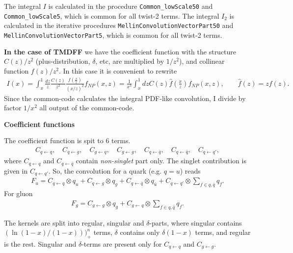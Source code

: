 \documentclass[prd,nofootinbib,eqsecnum,final]{revtex4}
\newcommand{\ot}{\leftarrow}
\renewcommand{\(}{\left(}
\renewcommand{\)}{\right)}
\renewcommand{\[}{\left[}
\renewcommand{\]}{\right]}
\begin{document}
The integral $I$ is calculated in the procedure \texttt{Common\_lowScale50} and \texttt{Common\_lowScale5}, which is common for all twist-2 terms. The integral $I_2$ is calculated in the iterative procedures \texttt{MellinConvolutionVectorPart50} and \texttt{MellinConvolutionVectorPart5}, which is common for all twist-2 terms. 

\textbf{In the case of TMDFF} we have the coefficient function with the structure $C(z)/z^2$ (plus-distribution, $\delta$, etc, are multiplied by $1/z^2$), and collinear function $f(z)/z^2$. In this case it is convenient to rewrite
\begin{eqnarray}
I(x)=\int_x^1 \frac{dz}{z}\frac{C(z)}{z^2}\frac{f\(\frac{x}{z}\)}{(x/z)^2}f_{NP}(x,z)=\frac{1}{x^3}\int_x^1 dz C(z)\hat f\(\frac{x}{z}\)f_{NP}(x,z),\qquad \hat f(z)=zf(z).
\end{eqnarray}
Since the common-code calculates the integral PDF-like convolution, I divide by factor $1/x^2$ all output of the common-code.

\begin{center}
\textbf{Coefficient functions}
\end{center}

The coefficient function is spit to 6 terms.
\begin{eqnarray}
C_{q\ot q},\quad C_{q\ot g},\quad C_{g\ot q},\quad C_{g\ot g},\quad C_{q\ot \bar q},\quad C_{q\ot \bar q},\quad C_{q\ot q'},
\end{eqnarray}
where $C_{q\ot q}$ and $C_{q\ot \bar q}$ contain \textit{non-singlet} part only. The singlet contribution is given in $C_{q\ot q'}$. So, the convolution for a quark (e.g. $q=u$) reads
\begin{eqnarray}
F_u=C_{q\ot q}\otimes q_u+C_{q\ot g}\otimes q_g+C_{q\ot \bar q}\otimes q_{\bar u}+C_{q\ot q'}\otimes \sum_{f\in q,\bar q} q_f.
\end{eqnarray}
For gluon
\begin{eqnarray}
F_g=C_{g\ot g}\otimes q_g+C_{g\ot q}\otimes \sum_{f\in q,\bar q} q_f.
\end{eqnarray}

The kernels are split into regular, singular and $\delta$-parts, where singular contains $(\ln(1-x)/(1-x)))_+^n$ terms, $\delta$ contains only $\delta(1-x)$ terms, and regular is the rest. Singular and $\delta$-terms are present only for $C_{q\ot q}$ and $C_{g\ot g}$.
\end{document}
